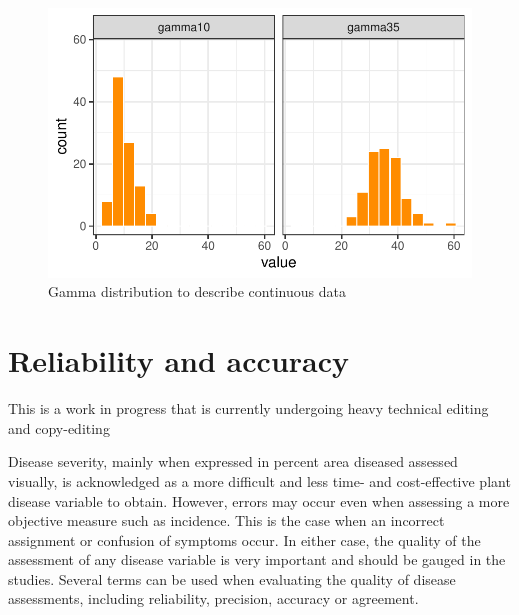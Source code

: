 \documentclass[
  letterpaper,
  DIV=11,
  numbers=noendperiod]{scrreprt}
\begin{document}
\begin{figure}[H]

{\centering \includegraphics{./data-type-distributions_files/figure-pdf/fig-gamma-1.pdf}

}

\caption{\label{fig-gamma}Gamma distribution to describe continuous
data}

\end{figure}

\hypertarget{reliability-and-accuracy}{%
\chapter{Reliability and accuracy}\label{reliability-and-accuracy}}

\begin{tcolorbox}[enhanced jigsaw, rightrule=.15mm, left=2mm, breakable, colframe=quarto-callout-note-color-frame, toprule=.15mm, leftrule=.75mm, bottomrule=.15mm, colback=white, arc=.35mm, opacityback=0]
\begin{minipage}[t]{5.5mm}
\textcolor{quarto-callout-note-color}{\faInfo}
\end{minipage}%
\begin{minipage}[t]{\textwidth - 5.5mm}
This is a work in progress that is currently undergoing heavy technical
editing and copy-editing\end{minipage}%
\end{tcolorbox}

Disease severity, mainly when expressed in percent area diseased
assessed visually, is acknowledged as a more difficult and less time-
and cost-effective plant disease variable to obtain. However, errors may
occur even when assessing a more objective measure such as incidence.
This is the case when an incorrect assignment or confusion of symptoms
occur. In either case, the quality of the assessment of any disease
variable is very important and should be gauged in the studies. Several
terms can be used when evaluating the quality of disease assessments,
including reliability, precision, accuracy or agreement.
\end{document}
